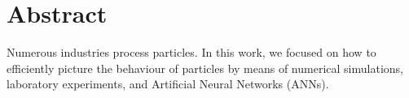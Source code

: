 
\cleardoublepage
{}
{}
\begingroup
\let\clearpage\relax
\let\cleardoublepage\relax
\let\cleardoublepage\relax


\renewcommand{\chaptermark}[1]{\markboth{#1}{}}

\fancyhf{}
\fancyhead[LE,RO]{\thepage}
\fancyhead[RE]{\nouppercase{\leftmark}}
\fancyhead[LO]{\nouppercase{\rightmark}}
\renewcommand{\headrulewidth}{0.5pt}

\renewcommand{\footrulewidth}{0pt}



% 

\chapter*{Abstract}

Numerous industries process particles.
In this work, we focused on how to efficiently picture the behaviour of
particles by means of numerical simulations, laboratory experiments, 
and Artificial Neural Networks (ANNs).

